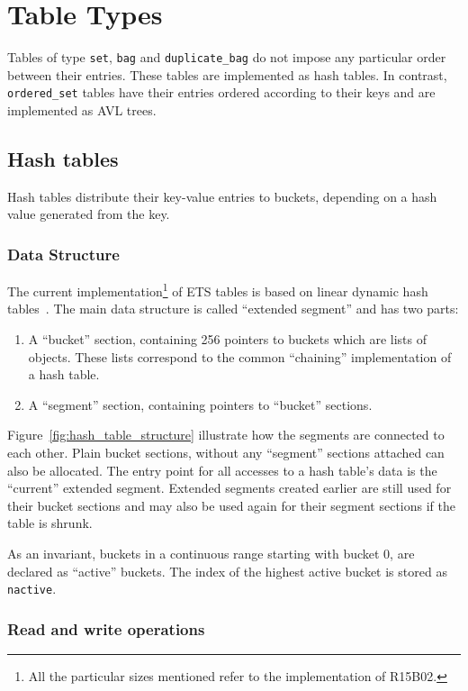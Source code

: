 \documentclass[aps,pre,preprint,nofootinbib]{revtex4}
\begin{document}
\section{Table Types} \label{sec:table_types}

Tables of type \verb|set|, \verb|bag| and \verb|duplicate_bag| do not impose any particular order between their entries.
These tables are implemented as hash tables.
In contrast, \verb|ordered_set| tables have their entries ordered according to their keys and are implemented as AVL trees.

\subsection{Hash tables}

Hash tables distribute their key-value entries to buckets, depending on a hash value generated from the key.

\subsubsection{Data Structure}

The current implementation\footnote{All the particular sizes mentioned refer to the implementation of R15B02.} of ETS tables is based on linear dynamic hash tables~\cite{Larson}.
The main data structure is called ``extended segment'' and has two parts:
\begin{enumerate}
\item A ``bucket'' section, containing 256 pointers to buckets which are lists of objects.
  These lists correspond to the common ``chaining'' implementation of a hash table.
\item A ``segment'' section, containing pointers to ``bucket'' sections.
\end{enumerate}
Figure~\ref{fig:hash_table_structure} illustrate how the segments are connected to each other. 
Plain bucket sections, without any ``segment'' sections attached can also be allocated.
The entry point for all accesses to a hash table's data is the ``current'' extended segment. 
Extended segments created earlier are still used for their bucket sections and may also be used again for their segment sections if the table is shrunk.

As an invariant, buckets in a continuous range starting with bucket 0, are declared as ``active'' buckets.
The index of the highest active bucket is stored as \verb|nactive|.

\subsubsection{Read and write operations}
\end{document}
